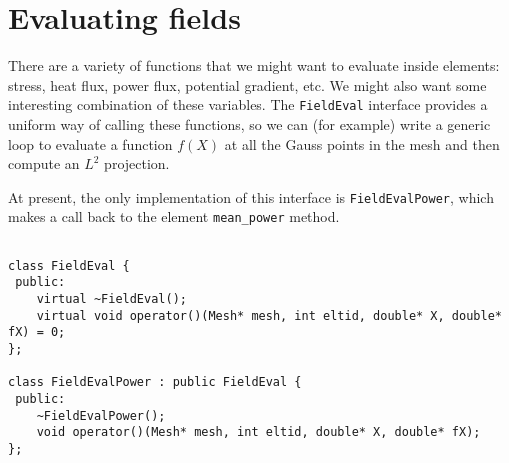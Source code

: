 \section{Evaluating fields}

There are a variety of functions that we might want to evaluate
inside elements: stress, heat flux, power flux, potential gradient,
etc.  We might also want some interesting combination of these
variables.  The {\tt FieldEval} interface provides a uniform way
of calling these functions, so we can (for example) write a generic
loop to evaluate a function $f(X)$ at all the Gauss points in the
mesh and then compute an $L^2$ projection.

At present, the only implementation of this interface is
{\tt FieldEvalPower}, which makes a call back to the element
{\tt mean\_power} method.
\begin{verbatim}

class FieldEval {
 public:
    virtual ~FieldEval();
    virtual void operator()(Mesh* mesh, int eltid, double* X, double* fX) = 0;
};

class FieldEvalPower : public FieldEval {
 public:
    ~FieldEvalPower();
    void operator()(Mesh* mesh, int eltid, double* X, double* fX);
};

\end{verbatim}
